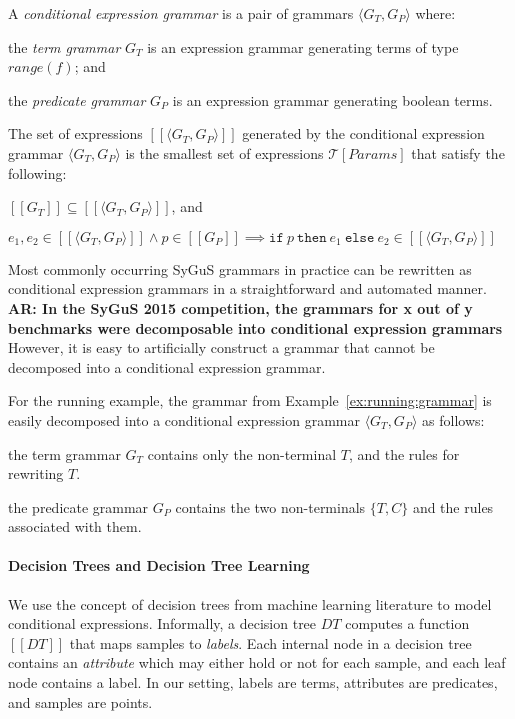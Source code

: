 \documentclass{llncs}
\newcommand\arsays[1]{{\bf AR: #1}}
\newcommand\tuple[1]{\langle #1 \rangle}
\newcommand\Expr{e}
\newcommand\Pred{p}
\newcommand\Grammar{G}
\newcommand\sem[1]{[\![ #1 ]\!]}
\newcommand\SynthFun{f}
\newcommand\range{\mathit{range}}
\newcommand\FormalParameters{\mathit{Params}}
\newcommand\Theory{\mathcal{T}}
\newcommand\ITE[3]{\mathtt{if}~#1~\mathtt{then}~#2~\mathtt{else}~#3}
\newcommand\DecisionTree{\mathit{DT}}
\newcommand{\sygus}{{\sffamily\fontsize{8.5}{10}\selectfont SyGuS}\xspace}
\begin{document}
A {\em conditional expression grammar} is a pair of grammars $\tuple{
\Grammar_T, \Grammar_P }$ where:
\begin{inparaenum}[(a)]
\item the {\em term grammar} $\Grammar_T$ is an expression grammar
  generating terms of type $\range(\SynthFun)$; and
\item the {\em predicate grammar} $\Grammar_P$ is an expression
  grammar generating boolean terms.
\end{inparaenum}
The set of expressions $\sem{\tuple{ \Grammar_T, \Grammar_P }}$
generated by the conditional expression grammar $\tuple{ G_T, G_P }$ is
the smallest set of expressions $\Theory[\FormalParameters]$ that
satisfy the following:
\begin{inparaenum}[(a)]
\item $\sem{\Grammar_T} \subseteq \sem{\tuple{ \Grammar_T, \Grammar_P
  }}$, and
\item $\Expr_1, \Expr_2 \in \sem{\tuple{ \Grammar_T, \Grammar_P }}
  \wedge \Pred \in \sem{\Grammar_P} \implies
  \ITE{\Pred}{\Expr_1}{\Expr_2} \in \sem{\tuple{ \Grammar_T, \Grammar_P }}$
\end{inparaenum}

Most commonly occurring SyGuS grammars in practice can be rewritten
as conditional expression grammars in a straightforward and automated
manner.
\arsays{In the \sygus 2015 competition, the grammars for x out of y
benchmarks were decomposable into conditional expression grammars}
However, it is easy to artificially construct a grammar that cannot be
decomposed into a conditional expression grammar.

\begin{example}
  For the running example, the grammar from
  Example~\ref{ex:running:grammar} is easily decomposed into a
  conditional expression grammar $\tuple{\Grammar_T, \Grammar_P}$ as
  follows:
  \begin{inparaenum}[(a)]
  \item the term grammar $\Grammar_T$ contains only the non-terminal
    $T$, and the rules for rewriting $T$.
  \item the predicate grammar $\Grammar_P$ contains the two
    non-terminals $\{ T, C \}$ and the rules associated with them.
  \end{inparaenum}
\end{example}

\paragraph{Decision Trees and Decision Tree Learning}
We use the concept of decision trees from machine learning literature to
model conditional expressions.
Informally, a decision tree $\DecisionTree$ computes a function
$\sem{\DecisionTree}$ that maps samples to {\em labels}.
Each internal node in a decision tree contains an {\em attribute} which
may either hold or not for each sample, and each leaf node contains a
label.
In our setting, labels are terms, attributes are predicates, and samples
are points.
\end{document}
